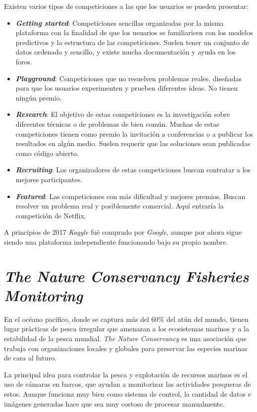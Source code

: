 Existen varios tipos de competiciones a las que los usuarios se pueden
presentar:

\begin{itemize}
  \item \textit{\textbf{Getting started}}: Competiciones sencillas organizadas por la
      misma plataforma con la finalidad de que los usuarios se familiaricen con
      los modelos predictivos y la estructura de las competiciones. Suelen tener
      un conjunto de datos ordenado y sencillo, y existe mucha documentación y
      ayuda en los foros.
  \item \textit{\textbf{Playground}}: Competiciones que no resuelven problemas
      reales, diseñadas para que los usuarios experimenten y prueben diferentes
      ideas. No tienen ningún premio.
  \item \textit{\textbf{Research}}: El objetivo de estas competiciones es la
      investigación sobre diferentes técnicas o de problemas de bien común.
      Muchas de estas competiciones tienen como premio la invitación a
      conferencias o a publicar los resultados en algún medio. Suelen requerir
      que las soluciones sean publicadas como código abierto.
  \item \textit{\textbf{Recruiting}}: Los organizadores de estas competiciones
      buscan contratar a los mejores participantes.
  \item \textit{\textbf{Featured}}: Las competiciones con más dificultad y
      mejores premios. Buscan resolver un problema real y posiblemente
      comercial. Aquí entraría la competición de Netflix.
\end{itemize}

A principios de 2017 \textit{Kaggle} fué comprado por \textit{Google}, aunque por ahora sigue siendo una
plataforma independiente funcionando bajo su propio nombre.

\section{\textit{The Nature Conservancy Fisheries Monitoring }}

En el océano pacífico, donde se captura más del 60\% del atún del mundo, tienen lugar prácticas de pesca irregular que amenazan a los ecosistemas marinos y a la estabilidad de la pesca mundial. \textit{The Nature Conservancy} es una asociación que trabaja con organizaciones locales y globales para preservar las especies marinas de cara al futuro.

La principal idea para controlar la pesca y explotación de recursos marinos es el uso de cámaras en barcos, que ayudan a monitorizar las actividades pesqueras de estos. Aunque funciona muy bien como sistema de control, la cantidad de datos e imágenes generadas hace que sea muy costoso de procesar manualmente.

